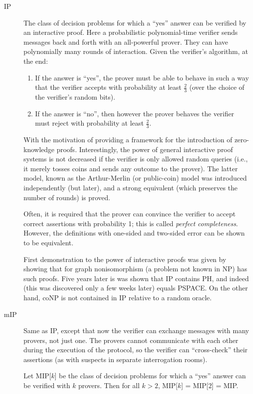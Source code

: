 \documentclass[a4paper]{article}
\newcommand{\cls}[1]{\rm{#1}}
\begin{document}
\begin{appendices}
\begin{description}
  \item[\cls{IP}] The class of decision problems for which a ``yes'' answer can be verified by an interactive proof.  Here a probabilistic polynomial-time verifier sends messages back and forth with an all-powerful prover.  They can have polynomially many rounds of interaction. Given the verifier's algorithm, at the end:
    \begin{enumerate}
      \item If the answer is ``yes'', the prover must be able to behave in such a way that the verifier accepts with probability at least $\frac23$ (over the choice of the verifier's random bits).
      \item If the answer is ``no'', then however the prover behaves the verifier must reject with probability at least $\frac23$.
    \end{enumerate}

    With the motivation of providing a framework for the introduction of zero-knowledge proofs. Interestingly, the power of general interactive proof systems is not decreased if the verifier is only allowed random queries (i.e., it merely tosses coins and sends any outcome to the prover). The latter model, known as the Arthur-Merlin (or public-coin) model was introduced independently (but later), and a strong equivalent (which preserves the number of rounds) is proved.

    Often, it is required that the prover can convince the verifier to accept correct assertions with probability 1; this is called \emph{perfect completeness}.
    However, the definitions with one-sided and two-sided error can be shown to be equivalent.


    First demonstration to the power of interactive proofs was given by showing that for graph nonisomorphism (a problem not known in \cls{NP}) has such proofs. Five years later is was shown that \cls{IP} contains \cls{PH}, and indeed (this was discovered only a few weeks later) equals \cls{PSPACE}.  On the other hand, \cls{coNP} is not contained in \cls{IP} relative to a random oracle.

  \item[\cls{mIP}] Same as \cls{IP}, except that now the verifier can exchange messages with many provers, not just one.  The provers cannot communicate with each other during the execution of the protocol, so the verifier can ``cross-check'' their assertions (as with suspects in separate interrogation rooms).

    Let \cls{MIP[$k$]} be the class of decision problems for which a ``yes'' answer can be verified with $k$ provers.  Then for all $k>2$, \cls{MIP[$k$]} = \cls{MIP[$2$]} = \cls{MIP}.


\end{description}
\end{appendices}
\end{document}
